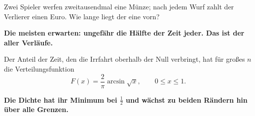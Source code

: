 \begin{merksatz}
Zwei Spieler werfen zweitausendmal eine Münze; nach jedem Wurf zahlt der Verlierer einen Euro. Wie lange liegt der eine vorn?

\begin{center}
\begin{minipage}{0.9\textwidth}
\textbf{Die meisten erwarten: ungefähr die Hälfte der Zeit jeder. Das ist der  aller Verläufe.}
\end{minipage}
\end{center}

Der Anteil der Zeit, den die Irrfahrt oberhalb der Null verbringt, hat für großes $n$ die Verteilungsfunktion
\[ F(x) = \frac{2}{\pi}\arcsin\sqrt{x}, \qquad 0 \le x \le 1 . \]

\begin{center}
\end{center}

\begin{center}
\begin{minipage}{0.9\textwidth}
\textbf{Die Dichte hat ihr Minimum bei $\tfrac12$ und wächst zu beiden Rändern hin über alle Grenzen.}
\end{minipage}
\end{center}
\end{merksatz}

